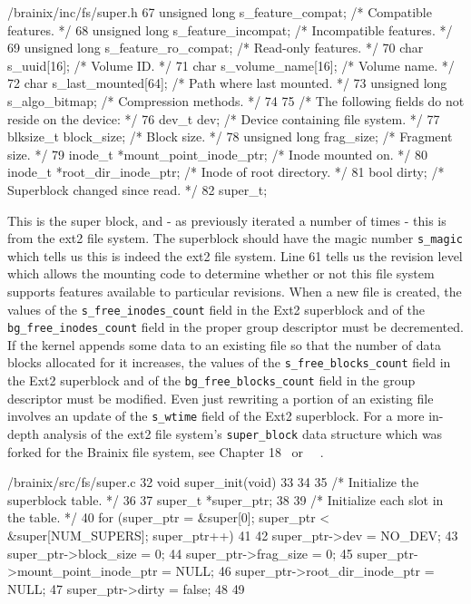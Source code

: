 \begin{code}{/brainix/inc/fs/super.h}
{67      unsigned long s_feature_compat;    /* Compatible features.            */
68      unsigned long s_feature_incompat;  /* Incompatible features.          */
69      unsigned long s_feature_ro_compat; /* Read-only features.             */
70      char s_uuid[16];                   /* Volume ID.                      */
71      char s_volume_name[16];            /* Volume name.                    */
72      char s_last_mounted[64];           /* Path where last mounted.        */
73      unsigned long s_algo_bitmap;       /* Compression methods.            */
74 
75      /* The following fields do not reside on the device: */
76      dev_t dev;                         /* Device containing file system. */
77      blksize_t block_size;              /* Block size.                    */
78      unsigned long frag_size;           /* Fragment size.                 */
79      inode_t *mount_point_inode_ptr;    /* Inode mounted on.              */
80      inode_t *root_dir_inode_ptr;       /* Inode of root directory.       */
81      bool dirty;                        /* Superblock changed since read. */
82 } super_t;
\end{code}
This is the super block, and - as previously iterated a number of times - this is from the ext2 file system. The superblock should have the magic number \verb|s_magic| which tells us this is indeed the ext2 file system. Line 61 tells us the revision level which allows the mounting code to determine whether or not this file system supports features available to particular revisions. When a new file is created, the values of the \verb|s_free_inodes_count| field in the Ext2 superblock and of the \verb|bg_free_inodes_count| field in the proper group descriptor must be decremented. If the kernel appends some data to an existing file so that the number of data blocks allocated for it increases, the values of the \verb|s_free_blocks_count| field in the Ext2 superblock and of the \verb|bg_free_blocks_count| field in the group descriptor must be modified. Even just rewriting a portion of an existing file involves an update of the \verb|s_wtime| field of the Ext2 superblock. For a more in-depth analysis of the ext2 file system's \verb|super_block| data structure which was forked for the Brainix file system, see Chapter 18~\cite{linuxbook} or \cite{3}~\cite{7}~\cite{8}.
\begin{code}{/brainix/src/fs/super.c}
32 void super_init(void)
33{
34
35 /* Initialize the superblock table. */
36
37      super_t *super_ptr;
38
39      /* Initialize each slot in the table. */
40      for (super_ptr = &super[0]; super_ptr < &super[NUM_SUPERS]; super_ptr++)
41      {
42           super_ptr->dev = NO_DEV;
43           super_ptr->block_size = 0;
44           super_ptr->frag_size = 0;
45           super_ptr->mount_point_inode_ptr = NULL;
46           super_ptr->root_dir_inode_ptr = NULL;
47           super_ptr->dirty = false;
48      }
49 }
\end{code}

